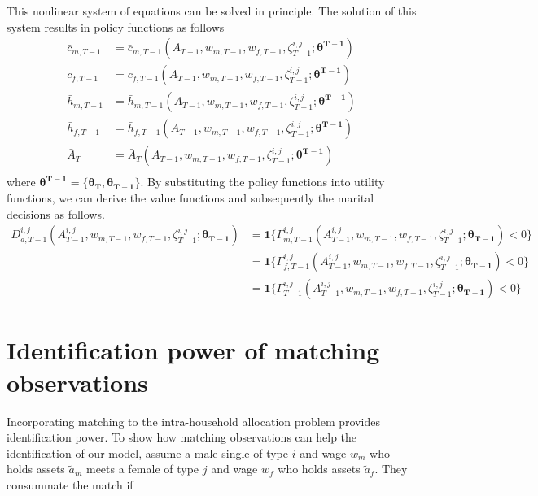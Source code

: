 This nonlinear system of equations can be solved in principle. The solution of this system results in policy functions as follows 
\begin{align*}
\bar c_{m,T-1} &= \bar c_{m,T-1}(A_{T-1}, w_{m,T-1}, w_{f,T-1}, \zeta^{i,j}_{T-1}; \bm{\theta^{T-1}}) \\
\bar c_{f,T-1} &= \bar c_{f,T-1}(A_{T-1}, w_{m,T-1}, w_{f,T-1}, \zeta^{i,j}_{T-1}; \bm{\theta^{T-1}})\\
\bar h_{m,T-1} &= \bar h_{m,T-1}(A_{T-1}, w_{m,T-1}, w_{f,T-1}, \zeta^{i,j}_{T-1}; \bm{\theta^{T-1}}) \\
\bar h_{f,T-1} &= \bar h_{f,T-1}(A_{T-1}, w_{m,T-1}, w_{f,T-1}, \zeta^{i,j}_{T-1}; \bm{\theta^{T-1}}) \\
\bar A_{T} &= \bar A_{T}(A_{T-1}, w_{m,T-1}, w_{f,T-1}, \zeta^{i,j}_{T-1}; \bm{\theta^{T-1}}) \\
\end{align*}
where $\bm{\theta^{T-1}} = \{\bm{\theta_{T}}, \bm{\theta_{T-1}}\}$. 
By substituting the policy functions into utility functions, we can derive the value functions and subsequently the marital decisions as follows. \begin{align}
D^{i,j}_{d,T-1} (A^{i,j}_{T-1}, w_{m,T-1}, w_{f,T-1}, \zeta^{i,j}_{T-1}; \bm{\theta_{T-1}}) &= \mathbf 1\{\Gamma_{m,T-1}^{i,j} (A^{i,j}_{T-1}, w_{m,T-1}, w_{f,T-1}, \zeta^{i,j}_{T-1}; \bm{\theta_{T-1}}) < 0\} \\
& = \mathbf 1\{\Gamma_{f,T-1}^{i,j} (A^{i,j}_{T-1}, w_{m,T-1}, w_{f,T-1}, \zeta^{i,j}_{T-1}; \bm{\theta_{T-1}}) < 0\} \nonumber \\
& = \mathbf 1\{\Gamma_{T-1}^{i,j} (A^{i,j}_{T-1}, w_{m,T-1}, w_{f,T-1}, \zeta^{i,j}_{T-1}; \bm{\theta_{T-1}}) < 0\} \nonumber
\end{align}
 
\section{Identification power of matching observations} \label{sec_5}

Incorporating matching to the intra-household allocation problem provides identification power. To show how matching observations can help the identification of our model,  assume a male single of type $i$ and wage $w_m$ who holds assets $\tilde a_m$ meets a female of type $j$ and wage $w_f$ who holds assets $\tilde a_f$. They consummate the match if 

